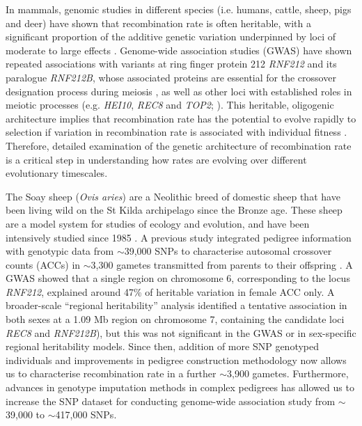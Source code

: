 \documentclass[a4paper,11pt]{article}
\begin{document}
In mammals, genomic studies in different species (i.e. humans, cattle, sheep, pigs and deer) have shown that recombination rate is often heritable, with a significant proportion of the additive genetic variation underpinned by loci of moderate to large effects \citep{Sandor2012, Kong2014, Ma2015, Kadri2016, Petit2017, Johnston2018, Johnsson2020}. Genome-wide association studies (GWAS) have shown repeated associations with variants at ring finger protein 212 \textit{RNF212} and its paralogue \textit{RNF212B}, whose associated proteins are essential for the crossover designation process during meiosis \citep{Reynolds2013}, as well as other loci with established roles in meiotic processes (e.g. \textit{HEI10}, \textit{REC8} and \textit{TOP2}; \citealt{Sandor2012, Kong2014, Ma2015, Kadri2016, Petit2017, Johnston2018, Johnsson2020}). This heritable, oligogenic architecture implies that recombination rate has the potential to evolve rapidly to selection if variation in recombination rate is associated with individual fitness \citep{Otto2001, Stapley2017}. Therefore, detailed examination of the genetic architecture of recombination rate is a critical step in understanding how rates are evolving over different evolutionary timescales.

The Soay sheep (\textit{Ovis aries}) are a Neolithic breed of domestic sheep that have been living wild on the St Kilda archipelago since the Bronze age. These sheep are a model system for studies of ecology and evolution, and have been intensively studied since 1985 \citep{CluttonBrock2004}. A previous study integrated pedigree information with genotypic data from $\sim$39,000 SNPs to characterise autosomal crossover counts (ACCs) in $\sim$3,300 gametes transmitted from parents to their offspring \citep{Johnston2016}. A GWAS showed that a single region on chromosome 6, corresponding to the locus \textit{RNF212}, explained around 47\% of heritable variation in female ACC only. A broader-scale ``regional heritability'' analysis identified a tentative association in both sexes at a 1.09 Mb region on chromosome 7, containing the candidate loci \textit{REC8} and \textit{RNF212B}), but this was not significant in the GWAS or in sex-specific regional heritability models. Since then, addition of more SNP genotyped individuals and improvements in pedigree construction methodology \citep{Huisman2017} now allows us to characterise recombination rate in a further $\sim$3,900 gametes. Furthermore, advances in genotype imputation methods in complex pedigrees has allowed us to increase the SNP dataset for conducting genome-wide association study from $\sim$39,000 to $\sim$417,000 SNPs. 
\end{document}
